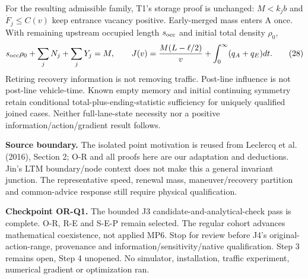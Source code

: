 \documentclass[11pt,a4paper]{article}
\begin{document}
For the resulting admissible family, T1's storage proof is unchanged:
$M<k_jb$ and $\dot F_j\leq C(v)$ keep entrance vacancy positive.
Early-merged mass enters A once. With remaining upstream occupied length
$s_{\rm occ}$ and initial total density $\rho_0$,
\begin{equation}
 s_{\rm occ}\rho_0+\sum_jN_j+\sum_jY_j=M,\qquad
 J(v)=\frac{M(L-\ell/2)}v+\int_0^\infty(q_A+q_E)dt. \tag{28}
\end{equation}
Retiring recovery information is not removing traffic. Post-line influence
is not post-line vehicle-time. Known empty memory and initial continuing
symmetry retain conditional total-plus-ending-statistic sufficiency for
uniquely qualified joined cases. Neither full-lane-state necessity nor a
positive information/action/gradient result follows.

\textbf{Source boundary.} The isolated point motivation is reused from
Leclercq et al. (2016), Section 2; O-R and all proofs here are our adaptation
and deductions. Jin's LTM boundary/node context does not make this a general
invariant junction. The representative speed, renewal mass, maneuver/recovery
partition and common-advice response still require physical qualification.

\textbf{Checkpoint OR-Q1.} The bounded J3 candidate-and-analytical-check
pass is complete. O-R, R-E and S-E-P remain selected. The regular cohort
advances mathematical coexistence, not applied MP6. Stop for review before
J4's original-action-range, provenance and information/sensitivity/native
qualification. Step 3 remains open, Step 4 unopened. No simulator,
installation, traffic experiment, numerical gradient or optimization ran.
\end{document}
